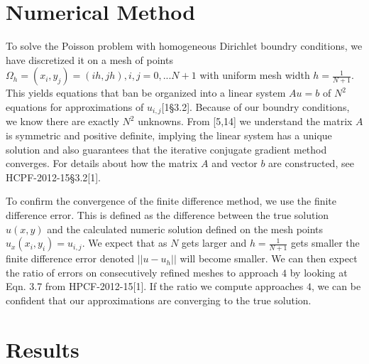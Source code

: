 \documentclass[11pt]{article}
\begin{document}
\section{Numerical Method}
To solve the Poisson problem with homogeneous Dirichlet boundry conditions, we have discretized it on a mesh of points $\Omega_h ={(x_i, y_j)=(ih,jh),i,j=0,...N+1}$ with uniform mesh width $h=\frac{1}{N+1}$. This yields equations that ban be organized into a linear system $Au=b$ of $N^2$ equations for approximations of $u_{i,j}$[1\S 3.2]. Because of our boundry conditions, we know there are exactly $N^2$ unknowns. From [5,14] we understand the matrix $A$ is symmetric and positive definite, implying the linear system has a unique solution and also guarantees that the iterative conjugate gradient method converges. For details about how the matrix $A$ and vector $b$ are constructed, see HCPF-2012-15\S3.2[1].

To confirm the convergence of the finite difference method, we use the finite difference error. This is defined as the difference between the true solution $u(x,y)$ and the calculated numeric solution defined on the mesh points $u_x(x_i,y_i)=u_{i,j}$. We expect that as $N$ gets larger and $h=\frac{1}{N+1}$ gets smaller the finite difference error denoted $||u-u_h||$ will become smaller. We can then expect the ratio of errors on consecutively refined meshes to approach $4$ by looking at Eqn. 3.7 from HPCF-2012-15[1]. If the ratio we compute approaches $4$, we can be confident that our approximations are converging to the true solution.


\section{Results}
\end{document}

